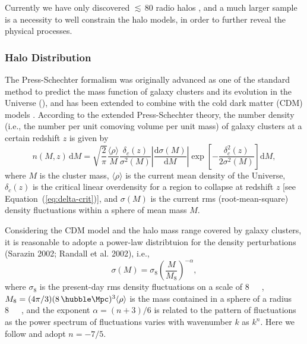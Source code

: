 \documentclass[modern]{aastex61}
\newcommand{\R}[1]{\mathrm{#1}}
\newcommand{\D}[1]{\R{d} #1}
\newcommand{\diff}[2]{\frac{\D{#1}}{\D{#2}}}
\begin{document}
Currently we have only discovered $\lesssim\,$80 radio halos
\citep{kale2016rev,duchesne2017}, and a much larger sample is a
necessity to well constrain the halo models, in order to further reveal
the physical processes.

\subsubsection{Halo Distribution}
\label{sec:distributions}

The Press-Schechter formalism was originally advanced as one of the standard
method to predict the mass function of galaxy clusters and its evolution
in the Universe (\citet{press1974}), and has been extended to combine with
the cold dark matter (CDM) models \citep[e.g.,][]{bond1991,lacey1993}.
According to the extended Press-Schechter theory, the number density (i.e.,
the number per unit comoving volume per unit mass) of galaxy clusters
at a certain redshift $z$ is given by
\begin{equation}
  n(M, z) \,\D{M} = \sqrt{\frac{2}{\pi}} \frac{\langle{\rho}\rangle}{M}
  \frac{\delta_c(z)}{\sigma^2(M)} \left| \diff{\sigma(M)}{M} \right|
  \exp\!\left[ -\frac{\delta_c^2(z)}{2\sigma^2(M)} \right] \D{M},
\end{equation}
where
$M$ is the cluster mass,
$\langle {\rho} \rangle$ is the current mean density of the Universe,
$\delta_c(z)$ is the critical linear overdensity for a region to collapse
at redshift $z$ [see Equation~(\ref{eq:delta-crit})],
and $\sigma(M)$ is the current rms (root-mean-square) density fluctuations
within a sphere of mean mass $M$.

Considering the CDM model and the halo mass range covered by galaxy
clusters, it is reasonable to adopte a power-law distribtuion
for the density perturbations (Sarazin 2002; Randall et al. 2002), i.e.,
\begin{equation}
  \sigma(M) = \sigma_8 \left( \frac{M}{M_8} \right)^{-\alpha},
\end{equation}
where $\sigma_8$ is the present-day rms density fluctuations on a
scale of \SI{8}{\per\hubble\Mpc},
$M_8 = (4\pi/3)(8 \,\si{\per\hubble\Mpc})^3 \langle{\rho}\rangle$
is the mass contained in a sphere of a radius \SI{8}{\per\hubble\Mpc},
and the exponent $\alpha = (n+3)/6$ is related to the pattern of
fluctuations
as the power spectrum of fluctuations varies with wavenumber $k$ as $k^n$.
Here we follow \citep{randall2002} and adopt $n = -7/5$.
\end{document}
